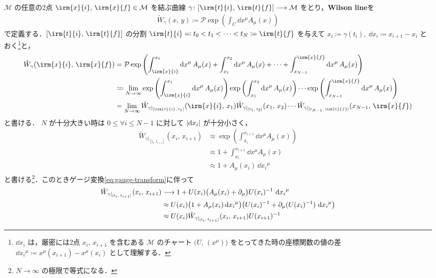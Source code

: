 \documentclass[TQFT_main]{subfiles}
\begin{document}
$\mathcal{M}$ の任意の2点 $\irm{x}{i},\, \irm{x}{f} \in \mathcal{M}$ を結ぶ曲線 $\gamma \colon [\irm{t}{i},\, \irm{t}{f}] \lto \mathcal{M}$ をとり，\textbf{Wilson line}を
\begin{align}
    \tilde{W}_\gamma (x,\, y) \coloneqq \mathcal{P} \exp \left( \int_C \dd{x^\mu} A_\mu (x) \right)
\end{align}
で定義する．$[\irm{t}{i},\, \irm{t}{f}]$ の分割 $\irm{t}{i} \eqqcolon t_0 < t_1 < \dots < t_N \coloneqq \irm{t}{f}$ を与えて $x_i \coloneqq \gamma(t_i),\; \dd{x_i} \coloneqq x_{i+1} - x_{i}$ とおく\footnote{$\dd{x_i}$ は，厳密には2点 $x_i,\, x_{i+1}$ を含むある $\mathcal{M}$ のチャート $\bigl( U,\, (x^\mu) \bigr)$ をとってきた時の座標関数の値の差 $\dd{x_i}^\mu \coloneqq x^\mu(x_{i+1}) - x^\mu(x_{i})$ として理解する．}と，
\begin{align}
    \tilde{W}_\gamma (\irm{x}{i},\, \irm{x}{f}) 
    &= \mathcal{P} \exp \left( \int_{\irm{x}{i}}^{x_1} \dd{x}^\mu A_\mu (x) + \int_{x_1}^{x_2} \dd{x}^\mu A_\mu (x) + \cdots + \int_{x_{N-1}}^{\irm{x}{f}} \dd{x}^\mu A_\mu (x) \right) \\
    &\coloneqq \lim_{N \to \infty} \exp \left(\int_{\irm{x}{i}}^{x_1} \dd{x}^\mu A_\mu (x)\right) \exp \left( \int_{x_1}^{x_2} \dd{x}^\mu A_\mu (x) \right) \cdots \exp \left( \int_{x_{N-1}}^{\irm{x}{f}} \dd{x}^\mu A_\mu (x) \right) \\
    &= \lim_{N \to \infty} \tilde{W}_{\gamma|_{[\irm{t}{i},\, t_1]}} (\irm{x}{i},\, x_1) \tilde{W}_{\gamma|_{[t_1,\, t_2]}} (x_1,\, x_2) \cdots \tilde{W}_{\gamma|_{[t_{N-1},\, \irm{t}{f}]}} (x_{N-1},\, \irm{x}{f}) 
\end{align}
と書ける．
$N$ が十分大きい時は $0 \le \forall i \le N-1$ に対して $\abs{\dd{x_i}}$ が十分小さく，
\begin{align}
    \tilde{W}_{\gamma|_{[t_{i},\, t_{i+1}]}} (x_{i},\, x_{i+1})
    &\approx \exp \left(\int_{x_i}^{x_{i+1}} \dd{x}^\mu A_\mu (x)\right) \\ 
    &\approx 1 + \int_{x_{i}}^{x_{i+1}} \dd{x}^\mu A_\mu (x) \\
    &\approx 1 + A_\mu (x_i)\, \dd{x_i}^\mu
\end{align}
と書ける\footnote{$N \to \infty$ の極限で等式になる．}．このときゲージ変換\eqref{eq:gauge-transform}に伴って
\begin{align}
    \tilde{W}_{\gamma|_{[t_{i},\, t_{i+1}]}} (x_{i},\, x_{i+1})
    &\longrightarrow 1 + U(x_{i}) \bigl(A_\mu (x_{i}) + \partial_\mu\bigr) U(x_{i})^{-1}\, \dd{x_{i}}^\mu \\
    &\approx U(x_i)\bigl( 1 + A_\mu (x_i) \dd{x_i}^\mu \bigr) \bigl(U(x_{i})^{-1} + \partial_\mu (U(x_{i})^{-1})\, \dd{x_i}^\mu \bigr) \\
    &\approx U(x_i) \tilde{W}_{\gamma|_{[t_{i},\, t_{i+1}]}} (x_{i},\, x_{i+1}) U(x_{i+1})^{-1}
\end{align}
\end{document}
